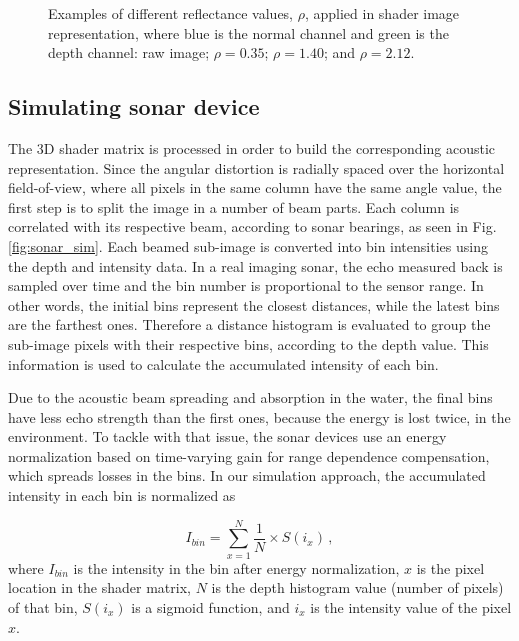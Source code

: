 \documentclass[final,5p,times]{elsarticle}
\begin{document}
\begin{figure}[h]
{        \label{fig:reflectance:2.12}
    }
    \captionsetup{justification=centering}
    \caption{Examples of different reflectance values, $\rho$, applied in
    shader image representation, where blue is the normal channel and
    green is the depth channel:  raw image;
     $\rho = 0.35$;
     $\rho = 1.40$; and
     $\rho = 2.12$.}
    \label{fig:sonar_reflectances}
\end{figure}



\subsection{Simulating sonar device}
\label{dev:sonardata}

The 3D shader matrix is processed in order to build the corresponding
acoustic representation. Since the angular distortion is radially spaced
over the horizontal field-of-view, where all pixels in the same column
have the same angle value, the first step is to split the image in a
number of beam parts. Each column is correlated with its respective beam,
according to sonar bearings, as seen in Fig. \ref{fig:sonar_sim}. Each
beamed sub-image is converted into bin intensities using the depth and
intensity data. In a real imaging sonar, the echo measured back is sampled
over time and the bin number is proportional to the sensor range. In other
words, the initial bins represent the closest distances, while the latest
bins are the farthest ones. Therefore a distance histogram is evaluated to
group the sub-image pixels with their respective bins, according to the
depth value. This information is used to calculate the accumulated
intensity of each bin.

Due to the acoustic beam spreading and absorption in the water, the final
bins have less echo strength than the first ones, because the energy is
lost twice, in the environment. To tackle with that issue, the sonar devices
use an energy normalization based on time-varying gain for range dependence
compensation, which spreads losses in the bins. In our simulation approach,
the accumulated intensity in each bin is normalized as

\begin{equation}
    \label{eq:1}
    I_{bin} = \sum\limits_{x=1}^N \frac{1}{N} \times S(i_{x}) \, ,
\end{equation}
where $I_{bin}$ is the intensity in the bin after energy normalization,
$x$ is the pixel location in the shader matrix, $N$ is the depth histogram
value (number of pixels) of that bin, $S(i_{x})$ is a sigmoid function,
and $i_{x}$ is the intensity value of the pixel $x$.
\end{document}
